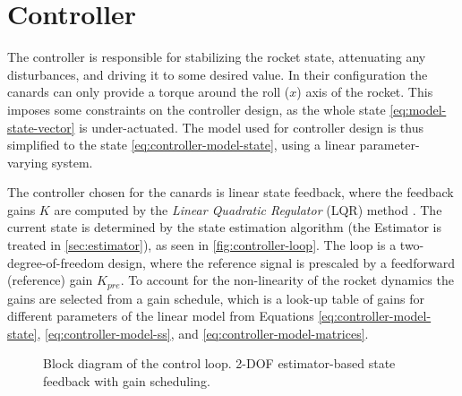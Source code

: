 \section{Controller}
The controller is responsible for stabilizing the rocket state, attenuating any disturbances, and driving it to some desired value.
In their configuration the canards can only provide a torque around the roll ($x$) axis of the rocket.
This imposes some constraints on the controller design, as the whole state \ref{eq:model-state-vector} is under-actuated.
The model used for controller design is thus simplified to the state \ref{eq:controller-model-state}, using a linear parameter-varying system.

The controller chosen for the canards is linear state feedback, where the feedback gains $K$ are computed by the \textit{Linear Quadratic Regulator} (LQR) method \cite{werner2021, werner2021b}.
The current state is determined by the state estimation algorithm (the Estimator is treated in \autoref{sec:estimator}), as seen in \autoref{fig:controller-loop}.
The loop is a two-degree-of-freedom design, where the reference signal is prescaled by a feedforward (reference) gain $K_{pre}$.
To account for the non-linearity of the rocket dynamics the gains are selected from a gain schedule, which is a look-up table of gains for different parameters of the linear model from Equations \ref{eq:controller-model-state}, 
\ref{eq:controller-model-ss}, and \ref{eq:controller-model-matrices}. 

\begin{figure}[ht]
    \centering
    \resizebox{0.8\textwidth}{!}{
    }
    \caption[Block diagram of the control loop]{Block diagram of the control loop. 2-DOF estimator-based state feedback \cite{werner2021} with gain scheduling.}
    \label{fig:controller-loop}
\end{figure}

